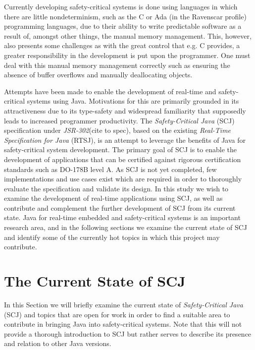 Currently developing safety-critical systems is done using languages in which there are little nondeterminism, such as the C or Ada (in the Ravenscar profile) programming languages, due to their ability to write predictable software as a result of, amongst other things, the manual memory management. This, however, also presents some challenges as with the great control that e.g. C provides, a greater responsibility in the development is put upon the programmer. One must deal with this manual memory management correctly such as ensuring the absence of buffer overflows and manually deallocating objects.

Attempts have been made to enable the development of real-time and safety-critical systems using Java. Motivations for this are primarily grounded in its attractiveness due to its type-safety and widespread familiarity that supposedly leads to increased programmer productivity\cite{henties:2009-20, Nilsen96issuesin}.
The \textit{Safety-Critical Java} (SCJ) specification under \textit{JSR-302}\cite{JSR}(cite to spec), based on the existing \textit{Real-Time Specification for Java} (RTSJ), is an attempt to leverage the benefits of Java for safety-critical system development. The primary goal of SCJ is to enable the development of applications that can be certified against rigorous certification standards such as DO-178B level A. As SCJ is not yet completed, few implementations and use cases exist which are required in order to thoroughly evaluate the specification and validate its design.
In this study we wish to examine the development of real-time applications using SCJ, as well as contribute and complement the further development of SCJ from its current state. Java for real-time embedded and safety-critical systems is an important research area, and in the following sections we examine the current state of SCJ and identify some of the currently hot topics in which this project may contribute.

\section{The Current State of SCJ}
In this Section we will briefly examine the current state of \textit{Safety-Critical Java} (SCJ) and topics that are open for work in order to find a suitable area to contribute in bringing Java into safety-critical systems. Note that this will not provide a thorough introduction to SCJ but rather serves to describe its presence and relation to other Java versions.

